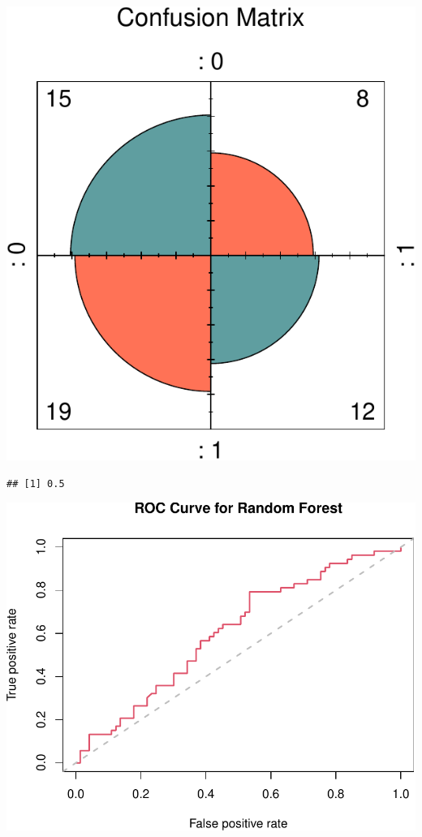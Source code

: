 \documentclass[11pt,preprint, authoryear]{elsarticle}
\numberwithin{equation}{section}
\numberwithin{figure}{section}
\numberwithin{table}{section}
\begin{document}
\includegraphics{ML_change_files/figure-latex/unnamed-chunk-15-1.pdf}

\begin{verbatim}
## [1] 0.5
\end{verbatim}

\includegraphics{ML_change_files/figure-latex/unnamed-chunk-17-1.pdf}
\end{document}
